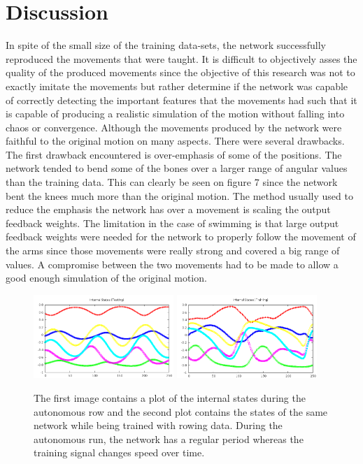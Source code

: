 \documentclass[letterpaper,9pt]{article}
\begin{document}
\section{Discussion}

In spite of the small size of the training data-sets, the network successfully reproduced the movements that were taught. It is difficult to objectively asses the quality of the produced movements since the objective of this research was not to exactly imitate the movements but rather determine if the network was capable of correctly detecting the important features that the movements had such that it is capable of producing a realistic simulation of the motion without falling into chaos or convergence. Although the movements produced by the network were faithful to the original motion on many aspects. There were several drawbacks.\\

The first drawback encountered is over-emphasis of some of the positions. The network tended to bend some of the bones over a larger range of angular values than the training data. This can clearly be seen on figure 7 since the network bent the knees much more than the original motion. The method usually used to reduce the emphasis the network has over a movement is scaling the output feedback weights. The limitation in the case of swimming is that large output feedback weights were needed for the network to properly follow the movement of the arms since those movements were really strong and covered a big range of values. A compromise between the two movements had to be made to allow a good enough simulation of the original motion. \pagebreak

\begin{figure}[h!]
  \centering
  \includegraphics[width=200px]{Extra/out_states_rowing.png}
  \includegraphics[width=200px]{Extra/train_states_rowing.png}
  \caption[Internal States Evolution]{The first image contains a plot of the internal states during the autonomous row and the second plot contains the states of the same network while being trained with rowing data. During the autonomous run, the network has a regular period whereas the training signal changes speed over time.}
\end{figure}
\end{document}
